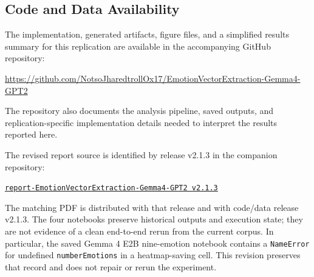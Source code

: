 \subsection*{Code and Data Availability}

The implementation, generated artifacts, figure files, and a simplified results summary for this replication are available in the 
accompanying GitHub repository:

\url{https://github.com/NotsoJharedtrollOx17/EmotionVectorExtraction-Gemma4-GPT2}

The repository also documents the analysis pipeline, saved outputs, and replication-specific implementation details needed to 
interpret the results reported here.

The revised report source is identified by release v2.1.3 in the companion repository:

\href{https://github.com/NotsoJharedtrollOx17/report-EmotionVectorExtraction-Gemma4-GPT2/releases/tag/v2.1.3}{\texttt{report-EmotionVectorExtraction-Gemma4-GPT2 v2.1.3}}

The matching PDF is distributed with that release and with code/data release v2.1.3. The four notebooks preserve historical
outputs and execution state; they are not evidence of a clean end-to-end rerun from the current corpus. In particular, the saved
Gemma 4 E2B nine-emotion notebook contains a \texttt{NameError} for undefined \texttt{numberEmotions} in a heatmap-saving cell.
This revision preserves that record and does not repair or rerun the experiment.
